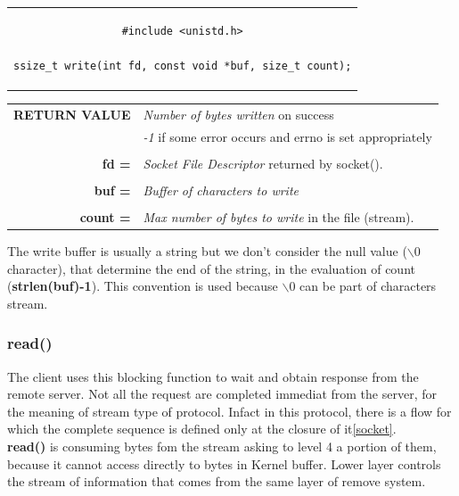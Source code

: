 \begin{center}
\begin{tabular}{c}
\begin{lstlisting}[linewidth=280pt, basicstyle=\footnotesize\sffamily,]
#include <unistd.h>

ssize_t write(int fd, const void *buf, size_t count);
\end{lstlisting}
\end{tabular}
\end{center}

\begin{table}[h]
\centering
\begin{tabular}{rcl}
\textbf{RETURN VALUE} & \multicolumn{2}{l}{\textit{Number of bytes written} on success}\\
{} & \multicolumn{2}{l}{\textit{-1} if some error occurs and errno is set appropriately}\\
& & \\
\textbf{fd =} & \multicolumn{2}{l}{\textit{Socket File Descriptor} returned by socket().}\\
& &\\
\textbf{buf =} & \multicolumn{2}{l}{\textit{Buffer of characters to write}}\\
& & \\
\textbf{count =} & \multicolumn{2}{l}{\textit{Max number of bytes to write} in the file (stream).}\\
\end{tabular}
\end{table}

The write buffer is usually a string but we don't consider the null value (\textbf{$\backslash 0$} character), that determine the end of the string, in the evaluation of count (\textbf{strlen(buf)-1}). This convention is used because \textbf{$\backslash 0$} can be part of characters stream.\\

\subsubsection{read()}
The client uses this blocking function to wait and obtain response from the remote server. Not all the request are completed immediat from the server, for the meaning of stream type of protocol. Infact in this protocol, there is a flow for which the complete sequence is defined only at the closure of it\ref{socket}.\\
\textbf{read()} is consuming bytes fom the stream asking to level 4 a portion of them, because it cannot access directly to bytes in Kernel buffer. Lower layer controls the stream of information that comes from the same layer of remove system.\\

